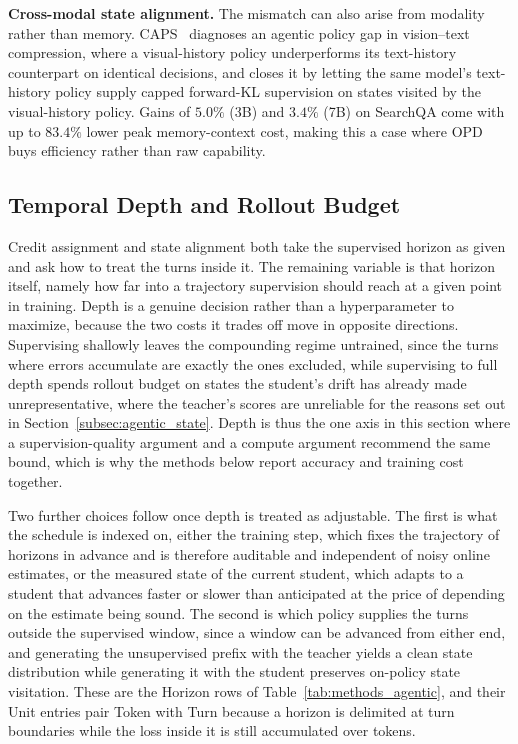 \documentclass{article} %
\begin{document}
\textbf{Cross-modal state alignment.} The mismatch can also arise from modality rather than memory. CAPS~\citep{2608.08960} diagnoses an agentic policy gap in vision--text compression, where a visual-history policy underperforms its text-history counterpart on identical decisions, and closes it by letting the same model's text-history policy supply capped forward-KL supervision on states visited by the visual-history policy. Gains of $5.0\%$ (3B) and $3.4\%$ (7B) on SearchQA come with up to $83.4\%$ lower peak memory-context cost, making this a case where OPD buys efficiency rather than raw capability.

\subsection{Temporal Depth and Rollout Budget}
\label{subsec:agentic_depth}

Credit assignment and state alignment both take the supervised horizon as given and ask how to treat the turns inside it. The remaining variable is that horizon itself, namely how far into a trajectory supervision should reach at a given point in training. Depth is a genuine decision rather than a hyperparameter to maximize, because the two costs it trades off move in opposite directions. Supervising shallowly leaves the compounding regime untrained, since the turns where errors accumulate are exactly the ones excluded, while supervising to full depth spends rollout budget on states the student's drift has already made unrepresentative, where the teacher's scores are unreliable for the reasons set out in Section~\ref{subsec:agentic_state}. Depth is thus the one axis in this section where a supervision-quality argument and a compute argument recommend the same bound, which is why the methods below report accuracy and training cost together.

Two further choices follow once depth is treated as adjustable. The first is what the schedule is indexed on, either the training step, which fixes the trajectory of horizons in advance and is therefore auditable and independent of noisy online estimates, or the measured state of the current student, which adapts to a student that advances faster or slower than anticipated at the price of depending on the estimate being sound. The second is which policy supplies the turns outside the supervised window, since a window can be advanced from either end, and generating the unsupervised prefix with the teacher yields a clean state distribution while generating it with the student preserves on-policy state visitation. These are the Horizon rows of Table~\ref{tab:methods_agentic}, and their Unit entries pair Token with Turn because a horizon is delimited at turn boundaries while the loss inside it is still accumulated over tokens.
\end{document}
